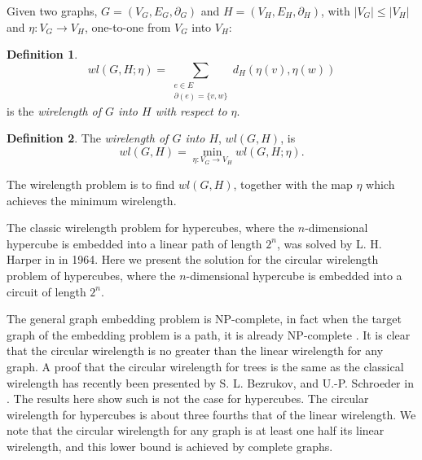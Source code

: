 \documentclass[12pt]{ucthesis}
\theoremstyle{plain}
\theoremstyle{definition}
\newtheorem{definition}{Definition}
\begin{document}
Given two graphs, $G = (V_G, E_G, \partial_G)$ and $H = (V_H, E_H, \partial_H)$,
with $|V_G| \le |V_H|$ and $\eta \colon V_G \rightarrow V_H$,
one-to-one from $V_G$ into $V_H$:
\begin{definition}
\label{Definition 2}
\begin{equation*}
wl(G, H; \eta) = \sum_{\substack{
	e \in E \\
	\partial(e) = \{v, w\}
}} d_H(\eta(v), \eta(w))
\end{equation*}
is the \emph{wirelength of $G$ into $H$ with respect to $\eta$}.
\end{definition}
\begin{definition}
\label{Definition 3}
The \emph{wirelength of $G$ into $H$}, $wl(G, H)$, is
\begin{equation*}
wl(G, H) = \min_{\eta \colon V_G \rightarrow V_H} wl(G, H; \eta).
\end{equation*}
\end{definition}

The wirelength problem is to find $wl(G, H)$,
together with the map $\eta$ which achieves the minimum wirelength.

The classic wirelength problem for hypercubes,
where the $n$-dimensional hypercube is embedded into a linear path of length $2^n$,
was solved by L. H. Harper in \cite{Harper.1964} in 1964.
Here we present the solution for the circular wirelength problem of hypercubes,
where the $n$-dimensional hypercube is embedded into a circuit of length $2^n$.

The general graph embedding problem is NP-complete,
in fact when the target graph of the embedding problem is a path,
it is already NP-complete \cite{Garey.1979}.
It is clear that the circular wirelength is no greater than the linear wirelength for any graph.
A proof that the circular wirelength for trees is the same as the classical wirelength
has recently been presented by S. L. Bezrukov, and U.-P. Schroeder in \cite{Bezrukov.1998}.
The results here show such is not the case for hypercubes.
The circular wirelength for hypercubes is about three fourths that of the linear wirelength.
We note that the circular wirelength for any graph is at least one half its linear wirelength,
and this lower bound is achieved by complete graphs.

\end{document}
